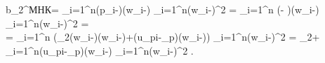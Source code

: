 \documentclass[a4paper,12pt]{article}
\newenvironment{myequation}[1]
{
	\renewcommand\theequation{#1}
	\multline
}
{
	\endmultline
}
\begin{document}
\begin{myequation}{$\Upsilon$}
b_2^{МНК}=
	\frac
	{
	\sum\limits_{i=1}^{n}(p_i-)(w_i-)
	}
	{
	\sum\limits_{i=1}^{n}(w_i-)^2
	}
	=
	\frac
	{
	\sum\limits_{i=1}^{n}
		(-
		)(w_i-)
	}
	{
	\sum\limits_{i=1}^{n}(w_i-)^2
	}
	=
	\\
	=
	\frac
	{
	\sum\limits_{i=1}^{n}
		(\beta_2(w_i-)(w_i-)+(u_{pi}-_p)(w_i-))
	}
	{
	\sum\limits_{i=1}^{n}(w_i-)^2
	}
	=
	\beta_2+
	\frac
	{
	\sum\limits_{i=1}^{n}(u_{pi}-_p)(w_i-)
	}
	{
	\sum\limits_{i=1}^{n}(w_i-)^2
	}.
\end{myequation}
\end{document}
